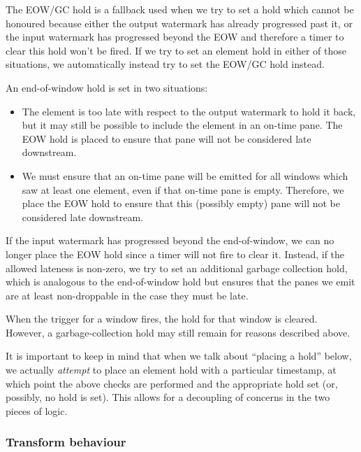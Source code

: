 
The EOW/GC hold is a fallback used when we try to set a hold which cannot be honoured because either the output watermark has already progressed past it, or the input watermark has progressed beyond the EOW and therefore a timer to clear this hold won't be fired.
If we try to set an element hold in either of those situations, we automatically instead try to set the EOW/GC hold instead.


An end-of-window hold is set in two situations:
\begin{itemize}
	\item The element is too late with respect to the output watermark to hold it back, but it may still be possible to include the element in an on-time pane.
	The EOW hold is placed to ensure that pane will not be considered late downstream.
	\item We must ensure that an on-time pane will be emitted for all windows which saw at least one element, even if that on-time pane is empty.
	Therefore, we place the EOW hold to ensure that this (possibly empty) pane will not be considered late downstream.
\end{itemize}

If the input watermark has progressed beyond the end-of-window, we can no longer place the EOW hold since a timer will not fire to clear it.
Instead, if the allowed lateness is non-zero, we try to set an additional garbage collection hold, which is analogous to the end-of-window hold but ensures that the panes we emit are at least non-droppable in the case they must be late.

When the trigger for a window fires, the hold for that window is cleared.
However, a garbage-collection hold may still remain for reasons described above.

It is important to keep in mind that when we talk about ``placing a hold'' below, we actually \emph{attempt} to place an element hold with a particular timestamp, at which point the above checks are performed and the appropriate hold set (or, possibly, no hold is set).
This allows for a decoupling of concerns in the two pieces of logic.

\subsubsection{Transform behaviour}

